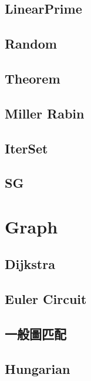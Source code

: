 \subsection{LinearPrime}

\subsection{Random}

\subsection{Theorem}

\subsection{Miller Rabin}

\subsection{IterSet}

\subsection{SG}


\section{Graph}

\subsection{Dijkstra}

%
\subsection{Euler Circuit}

\subsection{一般圖匹配}

\subsection{Hungarian}

